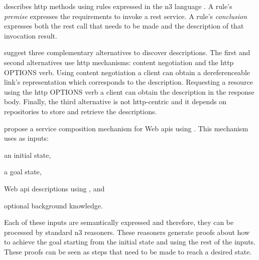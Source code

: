 \restdesc{} describes \acs{http} methods using rules expressed in the \ac{n3} language .
A rule's \emph{premise} expresses the requirements to invoke a \ac{rest} service.
A rule's \emph{conclusion} expresses both the \ac{rest} call that needs to be made and the description of that invocation result.


\citet{verborgh_functional_2012} suggest three complementary alternatives to discover descriptions.
The first and second alternatives use \ac{http} mechanisms: content negotiation and the \ac{http} OPTIONS verb.
Using content negotiation a client can obtain a dereferenceable link's representation which corresponds to the description. %
Requesting a resource using the \ac{http} OPTIONS verb a client can obtain the description in the response body.
Finally, the third alternative is not \ac{http}-centric and it depends on repositories to store and retrieve the descriptions.


\citet{verborgh_ijcs_2014} propose a service composition mechanism for Web \acp{api} using \restdesc{}.
This mechanism uses as inputs:
\begin{enumerate*}[label=\itshape(\arabic*\upshape)]
  \item an initial state,
  \item a goal state,
  \item Web \ac{api} descriptions using \restdesc{}, and
  \item optional background knowledge.
\end{enumerate*}
Each of these inputs are semantically expressed and therefore, they can be processed by standard \ac{n3} reasoners.
These reasoners generate proofs about how to achieve the goal starting from the initial state and using the rest of the inputs.
These proofs can be seen as steps that need to be made to reach a desired state.


